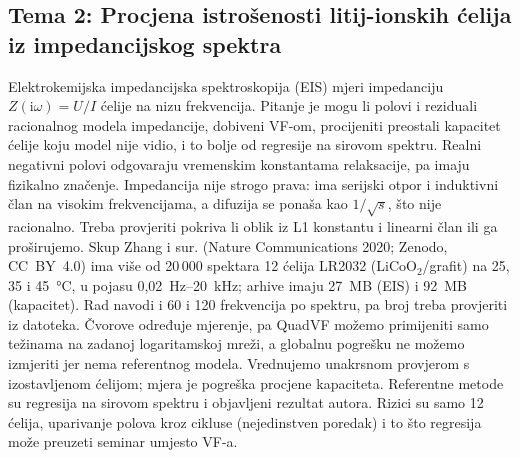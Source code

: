 \documentclass[10pt,a4paper]{article}
\begin{document}
\subsection*{Tema 2: Procjena istrošenosti litij-ionskih ćelija iz impedancijskog spektra}
Elektrokemijska impedancijska spektroskopija (EIS) mjeri impedanciju $Z(\mathrm{i}\omega)=U/I$
ćelije na nizu frekvencija. Pitanje je mogu li polovi i reziduali racionalnog modela impedancije,
dobiveni VF-om, procijeniti preostali kapacitet ćelije koju model nije vidio, i to bolje od
regresije na sirovom spektru. Realni negativni polovi odgovaraju vremenskim konstantama
relaksacije, pa imaju fizikalno značenje. Impedancija nije strogo prava: ima serijski otpor i
induktivni član na visokim frekvencijama, a difuzija se ponaša kao $1/\sqrt{s}$, što nije
racionalno. Treba provjeriti pokriva li oblik iz L1 konstantu i linearni član ili ga proširujemo.
Skup Zhang i sur. (Nature Communications 2020; Zenodo, CC~BY~4.0) ima više od 20\,000 spektara
12 ćelija LR2032 (LiCoO$_2$/grafit) na 25, 35 i 45~°C, u pojasu 0,02~Hz--20~kHz; arhive imaju
27~MB (EIS) i 92~MB (kapacitet). Rad navodi i 60 i 120 frekvencija po spektru, pa broj treba
provjeriti iz datoteka. Čvorove određuje mjerenje, pa QuadVF možemo primijeniti samo težinama na
zadanoj logaritamskoj mreži, a globalnu pogrešku ne možemo izmjeriti jer nema referentnog modela.
Vrednujemo unakrsnom provjerom s izostavljenom ćelijom; mjera je pogreška procjene kapaciteta.
Referentne metode su regresija na sirovom spektru i objavljeni rezultat autora. Rizici su samo
12 ćelija, uparivanje polova kroz cikluse (nejedinstven poredak) i to što regresija može preuzeti
seminar umjesto VF-a.
\end{document}
